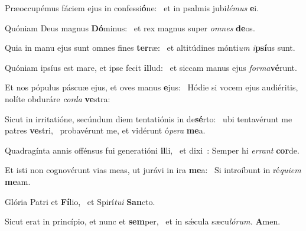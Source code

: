 \begin{psalmus}
Præoccupémus fáciem ejus in confessi\textbf{ó}\-ne:~\grestar{}
et in psalmis jubi\emph{\-lé\-mus }\textbf{e}\-i. \Abardot{}

Quóniam Deus magnus \textbf{Dó}\-minus:~\grestar{}
et rex magnus super \emph{om\-nes }\textbf{de}\-os.

Quia in manu ejus sunt omnes fines \textbf{ter}\-ræ:~\grestar{}
et altitúdines mónti\emph{\-um i}\textbf{psí}\-us sunt. \Abardot{}

Quóniam ipsíus est mare, et ipse fecit \textbf{il}\-lud:~\grestar{}
et siccam manus ejus \emph{for\-ma}\textbf{vé}\-runt. \Abardot{}

Et nos pópulus páscuæ ejus, et oves manus \textbf{e}\-jus:~\grestar{}
Hódie si vocem ejus audiéritis, nolíte obduráre \emph{cor\-da }\textbf{ve}\-stra:

Sicut in irritatióne, secúndum diem tentatiónis in de\textbf{sé}\-rto:~\gredagger{}
ubi tentavérunt me patres \textbf{ve}\-stri,~\grestar{}
probavérunt me, et vidérunt ó\emph{\-pe\-ra }\textbf{me}\-a. \Abardot{}

Quadragínta annis offénsus fui generatióni \textbf{il}\-li,~\grestar{}
et dixi~: Semper hi \emph{er\-rant }\textbf{cor}\-de.

Et isti non cognovérunt vias meas, ut jurávi in ira \textbf{me}\-a:~\grestar{}
Si introíbunt in ré\emph{\-qui\-em }\textbf{me}\-am. \Abardot{}

Glória Pat\-ri et \textbf{Fí}\-lio,~\grestar{}
et Spirí\emph{\-tui }\textbf{San}\-cto.

Sicut erat in princípio, et nunc et \textbf{sem}\-per,~\grestar{}
et in sǽcula sæcu\emph{ló\-rum. }\textbf{A}\-men. \Abardot{}
\end{psalmus}
